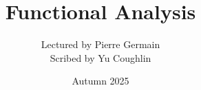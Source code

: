 \documentclass{article}
\begin{document}
\title{Functional Analysis}
\author{Lectured by Pierre Germain \\
Scribed by Yu Coughlin}
\date{Autumn 2025}

\maketitle

\tableofcontents
\end{document}
